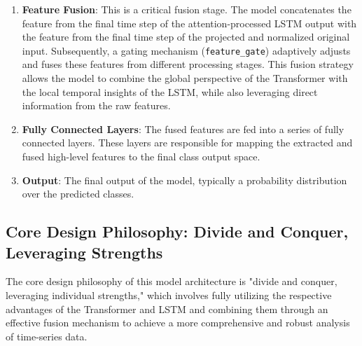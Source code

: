 \begin{enumerate}
    \item \textbf{Feature Fusion}: This is a critical fusion stage. The model concatenates the feature from the final time step of the attention-processed LSTM output with the feature from the final time step of the projected and normalized original input. Subsequently, a gating mechanism (\texttt{feature\_gate}) adaptively adjusts and fuses these features from different processing stages. This fusion strategy allows the model to combine the global perspective of the Transformer with the local temporal insights of the LSTM, while also leveraging direct information from the raw features.
    \item \textbf{Fully Connected Layers}: The fused features are fed into a series of fully connected layers. These layers are responsible for mapping the extracted and fused high-level features to the final class output space.
    \item \textbf{Output}: The final output of the model, typically a probability distribution over the predicted classes.
\end{enumerate}

\subsection{Core Design Philosophy: Divide and Conquer, Leveraging Strengths}

The core design philosophy of this model architecture is "divide and conquer, leveraging individual strengths," which involves fully utilizing the respective advantages of the Transformer and LSTM and combining them through an effective fusion mechanism to achieve a more comprehensive and robust analysis of time-series data.


